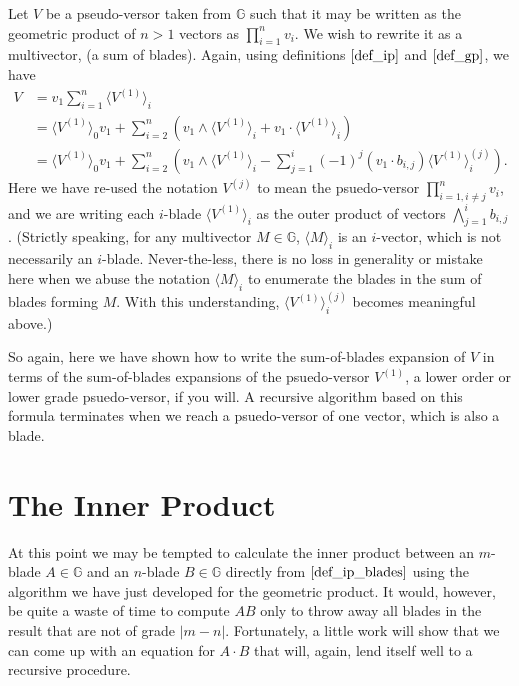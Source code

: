 \documentclass{article}
\newcommand{\G}{\mathbb{G}}
\begin{document}
Let $V$ be a pseudo-versor taken from $\G$ such that it may be written
as the geometric product of $n>1$ vectors as $\prod_{i=1}^n v_i$.
We wish to rewrite it as a multivector, (a sum of blades).
Again, using definitions $\eqref{def_ip}$ and $\eqref{def_gp}$,
we have
\begin{align}
V &= v_1\sum_{i=1}^n\langle V^{(1)}\rangle_i\nonumber \\
 &= \langle V^{(1)}\rangle_0 v_1 +
 \sum_{i=2}^n\left(v_1\wedge\langle V^{(1)}\rangle_i+v_1\cdot\langle V^{(1)}\rangle_i\right)\nonumber \\
 &= \langle V^{(1)}\rangle_0 v_1 +
 \sum_{i=2}^n\left(v_1\wedge\langle V^{(1)}\rangle_i
 - \sum_{j=1}^i(-1)^j(v_1\cdot b_{i,j})\langle V^{(1)}\rangle_i^{(j)}\right).\label{equ_gp_to_op}
\end{align}
Here we have re-used the notation $V^{(j)}$ to mean the psuedo-versor $\prod_{i=1,i\neq j}^n v_i$,
and we are writing each $i$-blade $\langle V^{(1)}\rangle_i$ as
the outer product of vectors $\bigwedge_{j=1}^i b_{i,j}$.  (Strictly speaking, for any
multivector $M\in\G$, $\langle M\rangle_i$ is an $i$-vector, which is not necessarily
an $i$-blade.  Never-the-less, there is no loss in generality or mistake here when we
abuse the notation $\langle M\rangle_i$ to enumerate the blades in the sum of blades
forming $M$.  With this understanding, $\langle V^{(1)}\rangle_i^{(j)}$ becomes meaningful above.)

So again, here
we have shown how to write the sum-of-blades expansion of $V$ in terms
of the sum-of-blades expansions of the psuedo-versor $V^{(1)}$, a lower order
or lower grade psuedo-versor, if you will.  A recursive algorithm based on this
formula terminates when we reach a psuedo-versor of one vector, which is also a blade.

\section*{The Inner Product}

At this point we may be tempted to calculate the inner product between an
$m$-blade $A\in\G$ and an $n$-blade $B\in\G$ directly from $\eqref{def_ip_blades}$
using the algorithm we have just developed for the geometric product.
It would, however, be quite a waste of time to compute $AB$ only to throw away
all blades in the result that are not of grade $|m-n|$.  Fortunately, a little
work will show that we can come up with an equation for $A\cdot B$ that will,
again, lend itself well to a recursive procedure.
\end{document}
